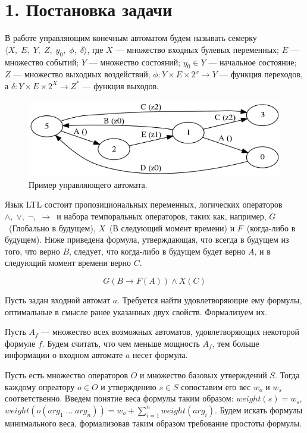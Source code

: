 \documentclass[12pt,fleqn]{article}
\begin{document}
\section*{1. Постановка задачи}

В работе управляющим конечным автоматом будем называть семерку $\langle X,\; E,\; Y,\; Z,\; y_0,\; \phi,\; \delta \rangle$,
где $X$ --- множество входных булевых переменных; $E$ --- множество событий; $Y$ --- множество состояний;
$y_0 \in Y$ --- начальное состояние; $Z$ --- множество выходных воздействий;
$\phi : Y \times E \times 2^x \rightarrow Y$ --- функция переходов, а
$\delta : Y \times E \times 2^X \rightarrow Z^*$ --- функция выходов.

\begin{figure}[!hb]
  \centering
    \includegraphics[scale=0.5]{lift.png}
  \caption{Пример управляющего автомата.}
\end{figure}

Язык LTL состоит пропозициональных переменных, логических операторов $\wedge,\; \vee,\; \lnot,\; \rightarrow$\ и набора
темпоральных операторов, таких как, например, $G$\ (Глобально в будущем), $X$\ (В следующий момент времени) и
$F$\ (когда-либо в будущем). Ниже приведена формула, утверждающая, что всегда в будущем из того, что верно $B$, следует,
что когда-либо в будущем будет верно $A$, и в следующий момент времени верно $C$.

$$
G(B \rightarrow F(A)) \wedge X(C)
$$

Пусть задан входной автомат $a$. Требуется найти удовлетворяющие ему формулы, оптимальные в смысле ранее указанных
двух свойств. Формализуем их.

Пусть $A_f$ --- множество всех возможных автоматов, удовлетворяющих некоторой формуле $f$. Будем считать,
что чем меньше мощность $A_f$, тем больше информации о входном автомате $a$ несет формула.

Пусть есть множество операторов $O$ и множество базовых утверждений $S$.
Тогда каждому опреатору $o \in O$ и утверждению $s \in S$ сопоставим его вес $w_o$ и $w_s$ соответственно.
Введем понятие веса формулы таким образом: $weight(s) = w_s$, $weight(o(arg_1\; \ldots \; arg_n)) = w_o + \sum_{i=1}^{n}weight(arg_i)$.
Будем искать формулы минимального веса, формализовав таким образом требование простоты формулы.
\end{document}
